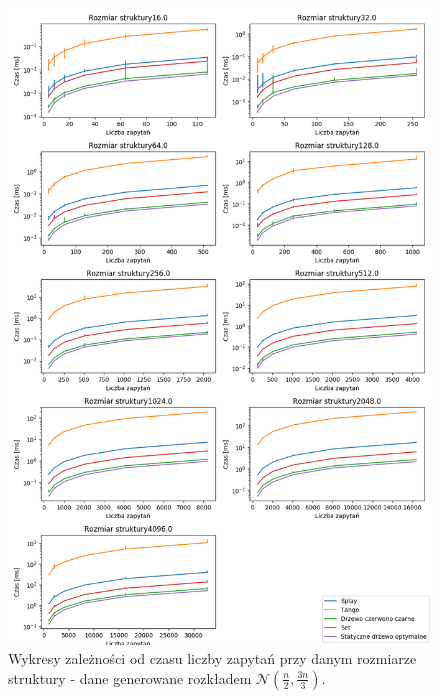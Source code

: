 \documentclass[declaration,shortabstract]{iithesis}
\theoremstyle{thm}
\theoremstyle{remark}
\theoremstyle{plain}
\theoremstyle{plain}
\theoremstyle{plain}
\begin{document}
\begin{figure}[H]  
\centering
    \includegraphics[scale=0.5]{wykresy/gaus075.png}
      \caption{Wykresy zależności od czasu liczby zapytań przy danym rozmiarze struktury - dane generowane rozkładem \(\mathcal{N}(\frac{n}{2}, \frac{3n}{3})\). }  
    \label{fig:zigzig} 
\end{figure}
\end{document}
